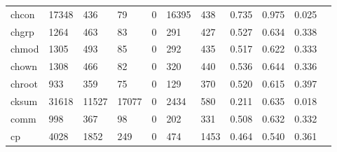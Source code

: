 \begin{longtable}{lp{1.10cm}p{1.10cm}p{1.10cm}p{1.10cm}p{1.10cm}p{1.10cm}p{1.10cm}p{1.10cm}p{1.10cm}p{1.10cm}}
chcon     &                  17348 &                                436 &                                79 &                                0 &                             16395 &                             438 &                             0.735 &                                 0.975 &                               0.025 \\
chgrp     &                   1264 &                                463 &                                83 &                                0 &                               291 &                             427 &                             0.527 &                                 0.634 &                               0.338 \\
chmod     &                   1305 &                                493 &                                85 &                                0 &                               292 &                             435 &                             0.517 &                                 0.622 &                               0.333 \\
chown     &                   1308 &                                466 &                                82 &                                0 &                               320 &                             440 &                             0.536 &                                 0.644 &                               0.336 \\
chroot    &                    933 &                                359 &                                75 &                                0 &                               129 &                             370 &                             0.520 &                                 0.615 &                               0.397 \\
cksum     &                  31618 &                              11527 &                             17077 &                                0 &                              2434 &                             580 &                             0.211 &                                 0.635 &                               0.018 \\
comm      &                    998 &                                367 &                                98 &                                0 &                               202 &                             331 &                             0.508 &                                 0.632 &                               0.332 \\
cp        &                   4028 &                               1852 &                               249 &                                0 &                               474 &                            1453 &                             0.464 &                                 0.540 &                               0.361 \\

\end{longtable}
